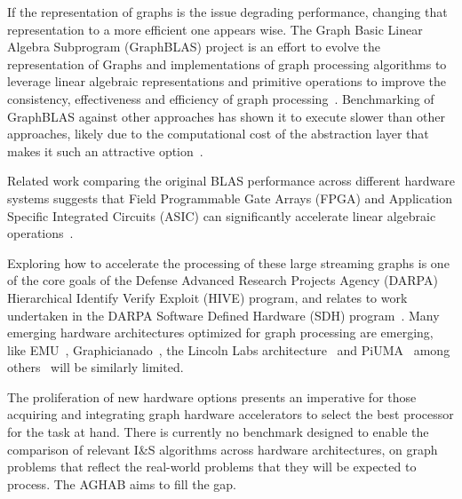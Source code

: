 {If the representation of graphs is the issue degrading performance, changing that representation to a more efficient one appears wise. 
The Graph Basic Linear Algebra Subprogram (GraphBLAS) project is an effort to evolve the representation of Graphs and implementations of graph processing algorithms to leverage linear algebraic representations and primitive operations to improve the consistency, effectiveness and efficiency of graph processing~\cite{Mattson2013,Mattson2019,Kepner2015,Kepner2016,Brock2021}.
Benchmarking of GraphBLAS against other approaches has shown it to execute slower than other approaches, likely due to the computational cost of the abstraction layer that makes it such an attractive option~\cite{Azad2020}. 

Related work comparing the original BLAS performance across different hardware systems suggests that Field Programmable Gate Arrays (FPGA) and Application Specific Integrated Circuits (ASIC) can significantly accelerate linear algebraic operations~\cite{Kestur2010,Xiong2020}.

Exploring how to accelerate the processing of these large streaming graphs is one of the core goals of the Defense Advanced Research Projects Agency (DARPA) Hierarchical Identify Verify Exploit (HIVE) program, and relates to work undertaken in the DARPA Software Defined Hardware (SDH) program~\cite{Regli2022b}.
Many emerging hardware architectures optimized for graph processing are emerging, like EMU~\cite{Dysart2016}, Graphicianado~\cite{Ham2016}, the Lincoln Labs architecture~\cite{Song2016} and PiUMA~\cite{Aananthakrishnan2020} among others~\cite{Peccerillo2022} will be similarly limited.

The proliferation of new hardware options presents an imperative for those acquiring and integrating graph hardware accelerators to select the best processor for the task at hand. 
There is currently no benchmark designed to enable the comparison of relevant I\&S algorithms across hardware architectures, on graph problems that reflect the real-world problems that they will be expected to process. 
The AGHAB aims to fill the gap. 



}

